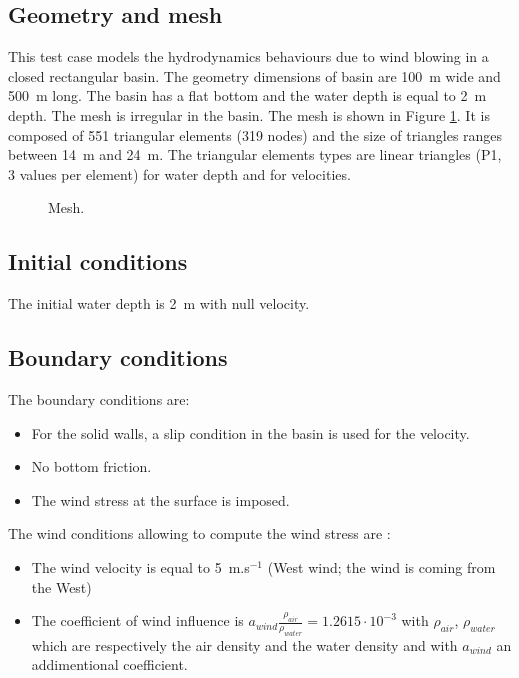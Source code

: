 \subsection{Geometry and mesh}

This test case models the hydrodynamics behaviours due to wind blowing 
in a closed rectangular basin. The geometry dimensions of basin are 100~m wide 
and  500~m long. The basin has a flat bottom and the water depth is equal to 2~m depth. 
The mesh is irregular in the basin. The mesh is shown in Figure \ref{t2d:wind:fig:mesh}. 
It is composed of 551 triangular elements (319 nodes) and the size of triangles
ranges between 14~m and 24~m. The triangular elements types are linear triangles 
(P1, 3 values per element) for water depth and for velocities.

\begin{figure}[!htbp]
 \centering
 \caption{Mesh.}
 \label{t2d:wind:fig:mesh}
\end{figure}

\subsection{Initial conditions}

The initial water depth is 2~m with null velocity.

\subsection{Boundary conditions}

The boundary conditions are:
\begin{itemize}
\item For the solid walls, a slip condition in the basin is used for the velocity.
\item No bottom friction.
\item The wind stress at the surface is imposed.
\end{itemize}
The wind conditions allowing to compute the wind stress are :
\begin{itemize}
\item The wind velocity is equal to 5~m.s$^{-1}$ 
(West wind; the wind is coming from the West)
\item The coefficient of wind influence is
 $a_{wind} \frac{\rho_{air}}{\rho_{water}} = 1.2615 \cdot 10^{-3}$ 
 with $\rho_{air}$, $\rho_{water}$ which are respectively the air density 
 and the water density and with $a_{wind}$ an addimentional coefficient.
\end{itemize}

